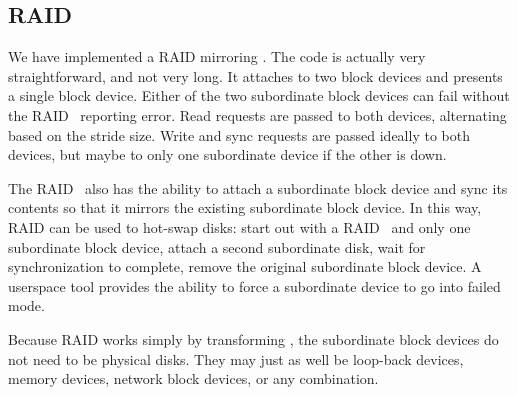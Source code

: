 \subsection{RAID}
\label{sec:modules:raid}

We have implemented a RAID mirroring \module. The code is actually very
straightforward, and not very long. It attaches to two block devices and
presents a single block device. Either of the two subordinate block devices can
fail without the RAID \module\ reporting error. Read requests are passed to both
devices, alternating based on the stride size. Write and sync requests are
passed ideally to both devices, but maybe to only one subordinate device if the
other is down.

The RAID \module\ also has the ability to attach a subordinate block device and
sync its contents so that it mirrors the existing subordinate block device. In
this way, RAID can be used to hot-swap disks: start out with a RAID \module\ and
only one subordinate block device, attach a second subordinate disk, wait for
synchronization to complete, remove the original subordinate block device. A
userspace tool provides the ability to force a subordinate device to go into
failed mode.

Because RAID works simply by transforming \chdescs, the subordinate
block devices do not need to be physical disks. They may just as well
be loop-back devices, memory devices, network block devices, or any
combination.
